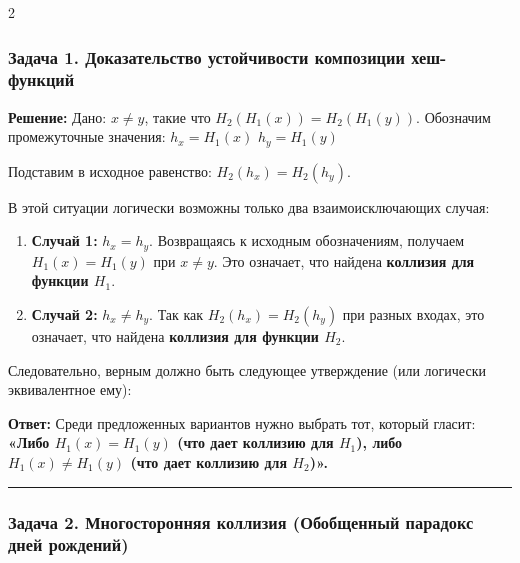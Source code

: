 ﻿\documentclass[10pt,a4paper,landscape]{extarticle}
\newcommand{\tightlist}{}
\begin{document}
\begin{multicols*}{2}
\subsubsection{Задача 1. Доказательство устойчивости композиции хеш-функций}\label{ux437ux430ux434ux430ux447ux430-1.-ux434ux43eux43aux430ux437ux430ux442ux435ux43bux44cux441ux442ux432ux43e-ux443ux441ux442ux43eux439ux447ux438ux432ux43eux441ux442ux438-ux43aux43eux43cux43fux43eux437ux438ux446ux438ux438-ux445ux435ux448-ux444ux443ux43dux43aux446ux438ux439}

\textbf{Решение:} Дано: \(x \neq y\), такие что \(H_2(H_1(x)) = H_2(H_1(y))\). Обозначим промежуточные значения: \(h_x = H_1(x)\) \(h_y = H_1(y)\)

Подставим в исходное равенство: \(H_2(h_x) = H_2(h_y)\).

В этой ситуации логически возможны только два взаимоисключающих случая:

\begin{enumerate}
\def\labelenumi{\arabic{enumi}.}
\tightlist
\item
  \textbf{Случай 1:} \(h_x = h_y\). Возвращаясь к исходным обозначениям, получаем \(H_1(x) = H_1(y)\) при \(x \neq y\). Это означает, что найдена \textbf{коллизия для функции \(H_1\)}.
\item
  \textbf{Случай 2:} \(h_x \neq h_y\). Так как \(H_2(h_x) = H_2(h_y)\) при разных входах, это означает, что найдена \textbf{коллизия для функции \(H_2\)}.
\end{enumerate}

Следовательно, верным должно быть следующее утверждение (или логически эквивалентное ему):

\textbf{Ответ:} Среди предложенных вариантов нужно выбрать тот, который гласит: \textbf{«Либо \(H_1(x) = H_1(y)\) (что дает коллизию для \(H_1\)), либо \(H_1(x) \neq H_1(y)\) (что дает коллизию для \(H_2\))».}

\begin{center}\rule{0.5\linewidth}{0.5pt}\end{center}

\subsubsection{Задача 2. Многосторонняя коллизия (Обобщенный парадокс дней рождений)}\label{ux437ux430ux434ux430ux447ux430-2.-ux43cux43dux43eux433ux43eux441ux442ux43eux440ux43eux43dux43dux44fux44f-ux43aux43eux43bux43bux438ux437ux438ux44f-ux43eux431ux43eux431ux449ux435ux43dux43dux44bux439-ux43fux430ux440ux430ux434ux43eux43aux441-ux434ux43dux435ux439-ux440ux43eux436ux434ux435ux43dux438ux439}


\end{multicols*}
\end{document}
